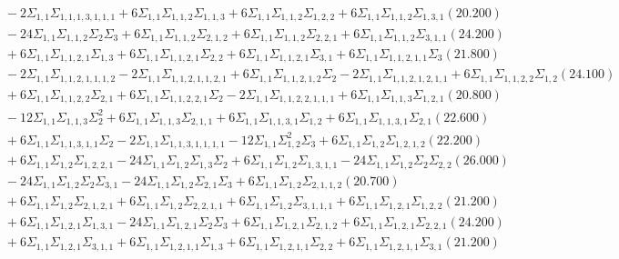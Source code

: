 \documentclass[12pt]{article}
\begin{document}
\begin{landscape}
\begin{align*}
		&\quad\quad -2\Sigma_{1,1}\Sigma_{1,1,1,3,1,1,1}+6\Sigma_{1,1}\Sigma_{1,1,2}\Sigma_{1,1,3}+6\Sigma_{1,1}\Sigma_{1,1,2}\Sigma_{1,2,2}+6\Sigma_{1,1}\Sigma_{1,1,2}\Sigma_{1,3,1}(20.200) \\ 
		&\quad\quad -24\Sigma_{1,1}\Sigma_{1,1,2}\Sigma_{2}\Sigma_{3}+6\Sigma_{1,1}\Sigma_{1,1,2}\Sigma_{2,1,2}+6\Sigma_{1,1}\Sigma_{1,1,2}\Sigma_{2,2,1}+6\Sigma_{1,1}\Sigma_{1,1,2}\Sigma_{3,1,1}(24.200) \\ 
		&\quad\quad +6\Sigma_{1,1}\Sigma_{1,1,2,1}\Sigma_{1,3}+6\Sigma_{1,1}\Sigma_{1,1,2,1}\Sigma_{2,2}+6\Sigma_{1,1}\Sigma_{1,1,2,1}\Sigma_{3,1}+6\Sigma_{1,1}\Sigma_{1,1,2,1,1}\Sigma_{3}(21.800) \\ 
		&\quad\quad -2\Sigma_{1,1}\Sigma_{1,1,2,1,1,1,2}-2\Sigma_{1,1}\Sigma_{1,1,2,1,1,2,1}+6\Sigma_{1,1}\Sigma_{1,1,2,1,2}\Sigma_{2}-2\Sigma_{1,1}\Sigma_{1,1,2,1,2,1,1}+6\Sigma_{1,1}\Sigma_{1,1,2,2}\Sigma_{1,2}(24.100) \\ 
		&\quad\quad +6\Sigma_{1,1}\Sigma_{1,1,2,2}\Sigma_{2,1}+6\Sigma_{1,1}\Sigma_{1,1,2,2,1}\Sigma_{2}-2\Sigma_{1,1}\Sigma_{1,1,2,2,1,1,1}+6\Sigma_{1,1}\Sigma_{1,1,3}\Sigma_{1,2,1}(20.800) \\ 
		&\quad\quad -12\Sigma_{1,1}\Sigma_{1,1,3}\Sigma_{2}^{2}+6\Sigma_{1,1}\Sigma_{1,1,3}\Sigma_{2,1,1}+6\Sigma_{1,1}\Sigma_{1,1,3,1}\Sigma_{1,2}+6\Sigma_{1,1}\Sigma_{1,1,3,1}\Sigma_{2,1}(22.600) \\ 
		&\quad\quad +6\Sigma_{1,1}\Sigma_{1,1,3,1,1}\Sigma_{2}-2\Sigma_{1,1}\Sigma_{1,1,3,1,1,1,1}-12\Sigma_{1,1}\Sigma_{1,2}^{2}\Sigma_{3}+6\Sigma_{1,1}\Sigma_{1,2}\Sigma_{1,2,1,2}(22.200) \\ 
		&\quad\quad +6\Sigma_{1,1}\Sigma_{1,2}\Sigma_{1,2,2,1}-24\Sigma_{1,1}\Sigma_{1,2}\Sigma_{1,3}\Sigma_{2}+6\Sigma_{1,1}\Sigma_{1,2}\Sigma_{1,3,1,1}-24\Sigma_{1,1}\Sigma_{1,2}\Sigma_{2}\Sigma_{2,2}(26.000) \\ 
		&\quad\quad -24\Sigma_{1,1}\Sigma_{1,2}\Sigma_{2}\Sigma_{3,1}-24\Sigma_{1,1}\Sigma_{1,2}\Sigma_{2,1}\Sigma_{3}+6\Sigma_{1,1}\Sigma_{1,2}\Sigma_{2,1,1,2}(20.700) \\ 
		&\quad\quad +6\Sigma_{1,1}\Sigma_{1,2}\Sigma_{2,1,2,1}+6\Sigma_{1,1}\Sigma_{1,2}\Sigma_{2,2,1,1}+6\Sigma_{1,1}\Sigma_{1,2}\Sigma_{3,1,1,1}+6\Sigma_{1,1}\Sigma_{1,2,1}\Sigma_{1,2,2}(21.200) \\ 
		&\quad\quad +6\Sigma_{1,1}\Sigma_{1,2,1}\Sigma_{1,3,1}-24\Sigma_{1,1}\Sigma_{1,2,1}\Sigma_{2}\Sigma_{3}+6\Sigma_{1,1}\Sigma_{1,2,1}\Sigma_{2,1,2}+6\Sigma_{1,1}\Sigma_{1,2,1}\Sigma_{2,2,1}(24.200) \\ 
		&\quad\quad +6\Sigma_{1,1}\Sigma_{1,2,1}\Sigma_{3,1,1}+6\Sigma_{1,1}\Sigma_{1,2,1,1}\Sigma_{1,3}+6\Sigma_{1,1}\Sigma_{1,2,1,1}\Sigma_{2,2}+6\Sigma_{1,1}\Sigma_{1,2,1,1}\Sigma_{3,1}(21.200) \\ 

\end{align*}
\end{landscape}
\end{document}
